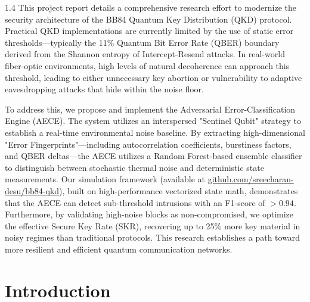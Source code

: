 \documentclass[journal,onecolumn,12pt,draftclsnofoot]{IEEEtran}
\begin{document}
\begin{spacing}{1.4}
\large
This project report details a comprehensive research effort to modernize the security architecture of the BB84 Quantum Key Distribution (QKD) protocol. Practical QKD implementations are currently limited by the use of static error thresholds—typically the 11\% Quantum Bit Error Rate (QBER) boundary derived from the Shannon entropy of Intercept-Resend attacks. In real-world fiber-optic environments, high levels of natural decoherence can approach this threshold, leading to either unnecessary key abortion or vulnerability to adaptive eavesdropping attacks that hide within the noise floor. 

To address this, we propose and implement the Adversarial Error-Classification Engine (AECE). The system utilizes an interspersed "Sentinel Qubit" strategy to establish a real-time environmental noise baseline. By extracting high-dimensional "Error Fingerprints"—including autocorrelation coefficients, burstiness factors, and QBER deltas—the AECE utilizes a Random Forest-based ensemble classifier to distinguish between stochastic thermal noise and deterministic state measurements. Our simulation framework (available at \href{https://github.com/sreecharan-desu/bb84-qkd}{github.com/sreecharan-desu/bb84-qkd}), built on high-performance vectorized state math, demonstrates that the AECE can detect sub-threshold intrusions with an F1-score of $>0.94$. Furthermore, by validating high-noise blocks as non-compromised, we optimize the effective Secure Key Rate (SKR), recovering up to 25\% more key material in noisy regimes than traditional protocols. This research establishes a path toward more resilient and efficient quantum communication networks.
\end{spacing}

\newpage

\tableofcontents
\newpage

\listoffigures
\listoftables
\newpage


\section{Introduction}
\end{document}
